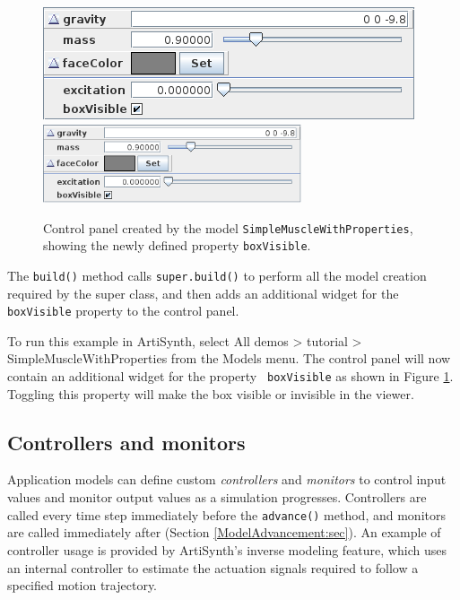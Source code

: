 \begin{figure}[t]
\begin{center}
\iflatexml
 \includegraphics[]{images/boxVisiblePanel}
\else
 \includegraphics[width=3in]{images/boxVisiblePanel}
\fi
\end{center}
\caption{Control panel created by the model {\tt SimpleMuscleWithProperties},
showing the newly defined property {\tt boxVisible}.}
\label{boxVisiblePanel:fig}
\end{figure}

The {\tt build()} method calls {\tt super.build()} to perform all the
model creation required by the super class, and then adds an
additional widget for the {\tt boxVisible} property to the control
panel.

To run this example in ArtiSynth, select {\sf All demos > tutorial >
SimpleMuscleWithProperties} from the {\sf Models} menu. The control
panel will now contain an additional widget for the property {\tt
boxVisible} as shown in Figure \ref{boxVisiblePanel:fig}. Toggling
this property will make the box visible or invisible in the viewer.


\subsection{Controllers and monitors}
\label{ControllersAndMonitors:sec}

Application models can define custom {\it controllers} and {\it
monitors} to control input values and monitor output values as a
simulation progresses. Controllers are called every time step
immediately before the {\tt advance()} method, and monitors are called
immediately after (Section \ref{ModelAdvancement:sec}).  An example of
controller usage is provided by ArtiSynth's inverse modeling feature,
which uses an internal controller to estimate the actuation signals
required to follow a specified motion trajectory.

